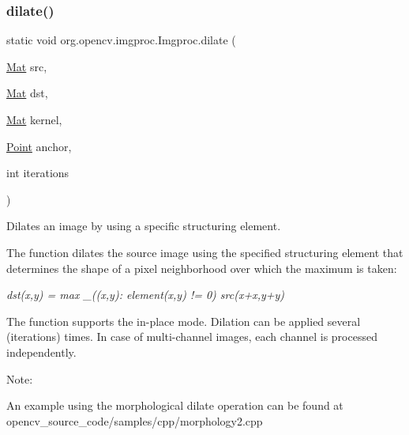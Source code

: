 \subsubsection{\texorpdfstring{dilate()}{dilate()}\hspace{0.1cm}{\footnotesize\ttfamily [2/3]}}
{\footnotesize\ttfamily static void org.\+opencv.\+imgproc.\+Imgproc.\+dilate (\begin{DoxyParamCaption}\item[{\mbox{\hyperlink{classorg_1_1opencv_1_1core_1_1_mat}{Mat}}}]{src,  }\item[{\mbox{\hyperlink{classorg_1_1opencv_1_1core_1_1_mat}{Mat}}}]{dst,  }\item[{\mbox{\hyperlink{classorg_1_1opencv_1_1core_1_1_mat}{Mat}}}]{kernel,  }\item[{\mbox{\hyperlink{classorg_1_1opencv_1_1core_1_1_point}{Point}}}]{anchor,  }\item[{int}]{iterations }\end{DoxyParamCaption})\hspace{0.3cm}{\ttfamily [static]}}

Dilates an image by using a specific structuring element.

The function dilates the source image using the specified structuring element that determines the shape of a pixel neighborhood over which the maximum is taken\+:

{\itshape dst(x,y) = max \+\_\+((x\textquotesingle{},y\textquotesingle{})\+: element(x\textquotesingle{},y\textquotesingle{}) != 0) src(x+x\textquotesingle{},y+y\textquotesingle{})}

The function supports the in-\/place mode. Dilation can be applied several ({\ttfamily iterations}) times. In case of multi-\/channel images, each channel is processed independently.

Note\+:


\begin{DoxyItemize}
\item An example using the morphological dilate operation can be found at opencv\+\_\+source\+\_\+code/samples/cpp/morphology2.\+cpp 
\end{DoxyItemize}


